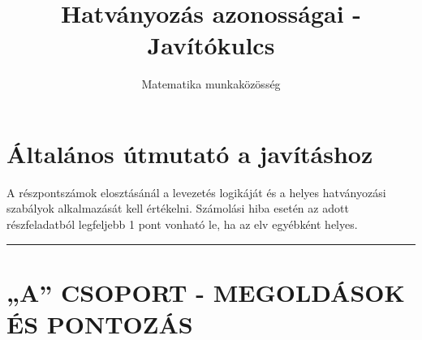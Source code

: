 \documentclass[a4paper,11pt]{article}
\title{Hatványozás azonosságai - Javítókulcs}
\author{Matematika munkaközösség}
\date{}
\begin{document}
\maketitle

\section*{Általános útmutató a javításhoz}
A részpontszámok elosztásánál a levezetés logikáját és a helyes hatványozási szabályok alkalmazását kell értékelni. Számolási hiba esetén az adott részfeladatból legfeljebb 1 pont vonható le, ha az elv egyébként helyes.

\vspace{0.5cm}
\hrule
\vspace{0.5cm}

\section*{„A” CSOPORT - MEGOLDÁSOK ÉS PONTOZÁS}
\end{document}
